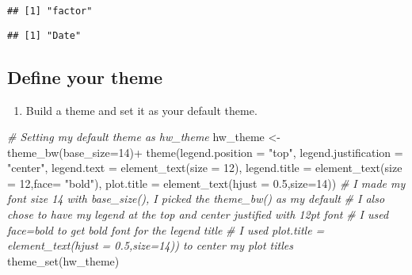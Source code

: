 \documentclass[
]{article}
\newenvironment{Shaded}{\begin{snugshade}}{\end{snugshade}}
\newcommand{\AttributeTok}[1]{\textcolor[rgb]{0.77,0.63,0.00}{#1}}
\newcommand{\CommentTok}[1]{\textcolor[rgb]{0.56,0.35,0.01}{\textit{#1}}}
\newcommand{\DecValTok}[1]{\textcolor[rgb]{0.00,0.00,0.81}{#1}}
\newcommand{\FloatTok}[1]{\textcolor[rgb]{0.00,0.00,0.81}{#1}}
\newcommand{\FunctionTok}[1]{\textcolor[rgb]{0.00,0.00,0.00}{#1}}
\newcommand{\NormalTok}[1]{#1}
\newcommand{\OtherTok}[1]{\textcolor[rgb]{0.56,0.35,0.01}{#1}}
\newcommand{\SpecialCharTok}[1]{\textcolor[rgb]{0.00,0.00,0.00}{#1}}
\newcommand{\StringTok}[1]{\textcolor[rgb]{0.31,0.60,0.02}{#1}}
\providecommand{\tightlist}{%
  \setlength{\itemsep}{0pt}\setlength{\parskip}{0pt}}
\begin{document}
\begin{verbatim}
## [1] "factor"
\end{verbatim}

\begin{Shaded}
\end{Shaded}

\begin{verbatim}
## [1] "Date"
\end{verbatim}

\hypertarget{define-your-theme}{%
\subsection{Define your theme}\label{define-your-theme}}

\begin{enumerate}
\def\labelenumi{\arabic{enumi}.}
\setcounter{enumi}{2}
\tightlist
\item
  Build a theme and set it as your default theme.
\end{enumerate}

\begin{Shaded}
\begin{Highlighting}[]
\CommentTok{\# Setting my default theme as hw\_theme}
\NormalTok{hw\_theme }\OtherTok{\textless{}{-}}\FunctionTok{theme\_bw}\NormalTok{(}\AttributeTok{base\_size=}\DecValTok{14}\NormalTok{)}\SpecialCharTok{+}
      \FunctionTok{theme}\NormalTok{(}\AttributeTok{legend.position =} \StringTok{"top"}\NormalTok{, }
        \AttributeTok{legend.justification =} \StringTok{"center"}\NormalTok{,}
        \AttributeTok{legend.text =} \FunctionTok{element\_text}\NormalTok{(}\AttributeTok{size =} \DecValTok{12}\NormalTok{),}
        \AttributeTok{legend.title =} \FunctionTok{element\_text}\NormalTok{(}\AttributeTok{size =} \DecValTok{12}\NormalTok{,}\AttributeTok{face=} \StringTok{"bold"}\NormalTok{),}
        \AttributeTok{plot.title =} \FunctionTok{element\_text}\NormalTok{(}\AttributeTok{hjust =} \FloatTok{0.5}\NormalTok{,}\AttributeTok{size=}\DecValTok{14}\NormalTok{))}
\CommentTok{\# I made my font size 14 with base\_size(), I picked the theme\_bw() as my default}
\CommentTok{\# I also chose to have my legend at the top and center justified with 12pt font }
\CommentTok{\# I used face=bold to get bold font for the legend title }
\CommentTok{\# I used plot.title = element\_text(hjust = 0.5,size=14)) to center my plot titles}
\FunctionTok{theme\_set}\NormalTok{(hw\_theme)}
\end{Highlighting}
\end{Shaded}
\end{document}
